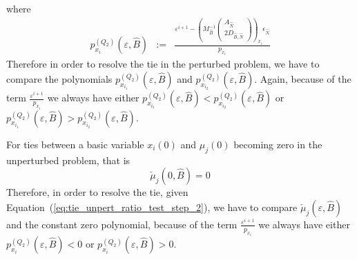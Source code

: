 \documentclass[a4paper]{article}
\newcommand{\px}[3]{\ensuremath{p_{x_{#1}}^{(#2)}(\varepsilon, #3)}}
\begin{document}
where
\begin{eqnarray}
\label{def:p_x_i_Q_2}
p_{x_{i}}^{(Q_{2})}(\varepsilon, \hat{B}) &:=&
  \frac{\varepsilon^{i+1} -
         \left(M_{\hat{B}}^{-1}
           \left(\begin{array}{c}
                    A_{\hat{N}}  \\
	            \hline
	            2D_{\hat{B}, \hat{N}}
	         \end{array}
	   \right)
         \right)_{x_{i}}\epsilon_{\hat{N}}}{p_{x_{i}}}
\end{eqnarray}
Therefore in order to resolve the tie in the perturbed problem, we have to
compare the polynomials \px{i_{1}}{Q_{2}}{\hat{B}} and
\px{i_{2}}{Q_{2}}{\hat{B}}. Again, because of the term
$\frac{\varepsilon^{i+1}}{p_{x_{i}}}$ we always have either
$\px{i_{1}}{Q_{2}}{\hat{B}} < \px{i_{2}}{Q_{2}}{\hat{B}}$ or
$\px{i_{1}}{Q_{2}}{\hat{B}} > \px{i_{2}}{Q_{2}}{\hat{B}}$.

For ties between a basic variable $x_{i}(0)$ and $\mu_{j}(0)$ becoming zero
in the unperturbed problem, that is
\begin{equation}
\label{eq:tie_unpert_ratio_test_step_2}
  \check{\mu}_{j}(0, \hat{B}) = 0
\end{equation}
Therefore, in order to resolve the tie,
given Equation~(\ref{eq:tie_unpert_ratio_test_step_2}), we have to compare
$\check{\mu}_{j}(\varepsilon, \hat{B})$ and the constant zero polynomial,
because of the term $\frac{\varepsilon^{i+1}}{p_{x_{i}}}$ we always have
either $\px{i}{Q_{2}}{\hat{B}} < 0$ or $\px{i}{Q_{2}}{\hat{B}} > 0$.
\end{document}
